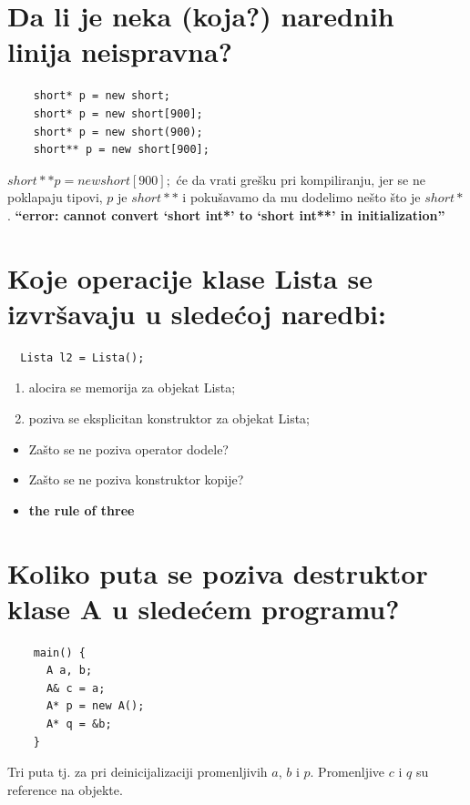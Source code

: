 \documentclass[a4paper]{article}
\begin{document}
\section{Da li je neka (koja?) narednih linija neispravna?}
    \begin{lstlisting}
    short* p = new short;
    short* p = new short[900];
    short* p = new short(900);
    short** p = new short[900];\end{lstlisting}

    $short** p = new short[900];$ će da vrati grešku pri kompiliranju, jer se ne poklapaju tipovi, 
    $p$ je $short**$ i pokušavamo da mu dodelimo nešto što je $short*$.
    \textbf{“error: cannot convert ‘short int*’ to ‘short int**’ in initialization”}
 
\section{Koje operacije klase Lista se izvršavaju u sledećoj naredbi:}
  \begin{lstlisting}
  Lista l2 = Lista();\end{lstlisting}

    \begin{enumerate}
      \item alocira se memorija za objekat Lista;
      \item poziva se eksplicitan konstruktor za objekat Lista;
    \end{enumerate}
    \thinspace
    \begin{itemize}
      \item Zašto se ne poziva operator dodele?
      \item Zašto se ne poziva konstruktor kopije? \cite{gfg_copy_assignment}
            \cite{cppref_copy_assignment}
      \item \textbf{the rule of three} \cite{sof_rule_of_three}
    \end{itemize}
    
\section{Koliko puta se poziva destruktor klase A u sledećem programu?}
    \begin{lstlisting}
    main() {
      A a, b;
      A& c = a;
      A* p = new A();
      A* q = &b;
    }\end{lstlisting}

    Tri puta tj. za pri deinicijalizaciji promenljivih $a$, $b$ i $p$. Promenljive $c$ i $q$ su reference 
    na objekte.
\end{document}
